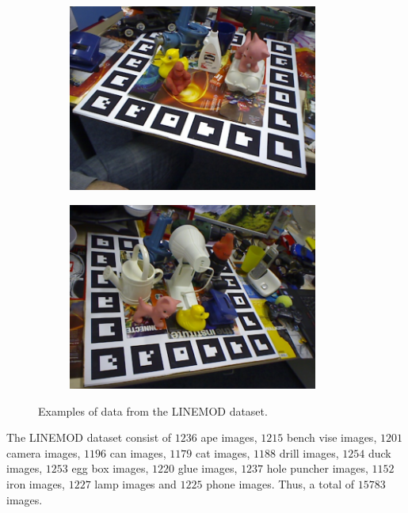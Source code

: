 \documentclass[../main.tex]{subfiles}
\begin{document}
\begin{figure}[H]
\begin{subfigure}[t]{0.24\textwidth}
        \includegraphics[width=0.9\textwidth]{figures/linemod/example03.png}
        \label{subfig:linemod_example03}
    \end{subfigure}
    \begin{subfigure}[t]{0.24\textwidth}
        \centering
        \captionsetup{width=.9\textwidth}
        \includegraphics[width=0.9\textwidth]{figures/linemod/example04.png}
        \label{subfig:linemod_example04}
    \end{subfigure}
    \caption{Examples of data from the LINEMOD dataset.}
    \label{fig:linemod_examples}
\end{figure}

The LINEMOD dataset consist of $1236$ ape images, $1215$ bench vise images, $1201$ camera images, $1196$ can images, $1179$ cat images, $1188$ drill images, $1254$ duck images, $1253$ egg box images, $1220$ glue images, $1237$ hole puncher images, $1152$ iron images, $1227$ lamp images and $1225$ phone images. Thus, a total of $15783$ images.
\end{document}
